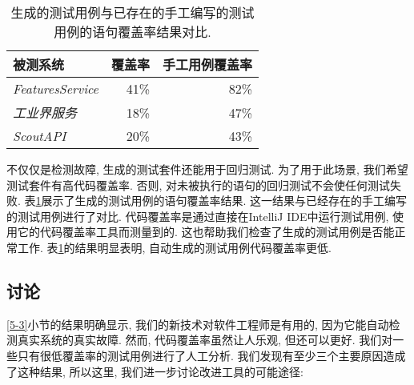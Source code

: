     \begin{table}
      \small
        \centering
        \begin{tabular}{lrr}
          \toprule
            被测系统 & 覆盖率 & 手工用例覆盖率 \\
            \midrule
            \textit{FeaturesService} & 41\% & 82\% \\
            \textit{工业界服务} & 18\% & 47\% \\
            \textit{ScoutAPI} & 20\% & 43\% \\
            \bottomrule
        \end{tabular}
        \caption[]{生成的测试用例与已存在的手工编写的测试用例的语句覆盖率结果对比. }
        \label{table3}
    \end{table}
        
        不仅仅是检测故障, 生成的测试套件还能用于回归测试. 为了用于此场景, 我们希望测试套件有高代码覆盖率. 否则, 对未被执行的语句的回归测试不会使任何测试失败. 表\ref{table3}展示了生成的测试用例的语句覆盖率结果. 这一结果与已经存在的手工编写的测试用例进行了对比. 代码覆盖率是通过直接在IntelliJ IDE中运行测试用例, 使用它的代码覆盖率工具而测量到的. 这也帮助我们检查了生成的测试用例是否能正常工作. 表\ref{table3}的结果明显表明, 自动生成的测试用例代码覆盖率更低. 
        
    
    \subsection{讨论}
      \ref{5-3}小节的结果明确显示, 我们的新技术对软件工程师是有用的, 因为它能自动检测真实系统的真实故障. 然而, 代码覆盖率虽然让人乐观, 但还可以更好. 我们对一些只有很低覆盖率的测试用例进行了人工分析. 我们发现有至少三个主要原因造成了这种结果, 所以这里, 我们进一步讨论改进工具的可能途径: 
        
